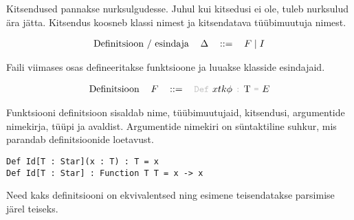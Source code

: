 \documentclass[12pt]{article}
\begin{document}
    Kitsendused pannakse nurksulgudesse. Juhul kui kitsedusi ei ole, tuleb nurksulud ära jätta. Kitsendus koosneb klassi nimest ja kitsendatava tüübimuutuja nimest.

    \begin{equation*}
      \begin{tabular}{llll}
        Definitsioon / esindaja & $\Delta$ & $::=$ & $F\mid I$
      \end{tabular}
    \end{equation*}

    Faili viimases osas defineeritakse funktsioone ja luuakse klasside esindajaid.

    \begin{equation*}
      \begin{tabular}{llll}
        Definitsioon & $F$ & $::=$ & {\color{helehall}\verb!Def!} $xtk\phi$ {\color{helehall}\verb!:!} T {\color{helehall}\verb!=!} $E$
      \end{tabular}
    \end{equation*}

    Funktsiooni definitsioon sisaldab nime, tüübimuutujaid, kitsendusi, argumentide nimekirja, tüüpi ja avaldist. Argumentide nimekiri on süntaktiline suhkur, mis parandab definitsioonide loetavust.

    \begin{verbatim}Def Id[T : Star](x : T) : T = x
Def Id[T : Star] : Function T T = x -> x\end{verbatim}

    Need kaks definitsiooni on ekvivalentsed ning esimene teisendatakse parsimise järel teiseks.
\end{document}
